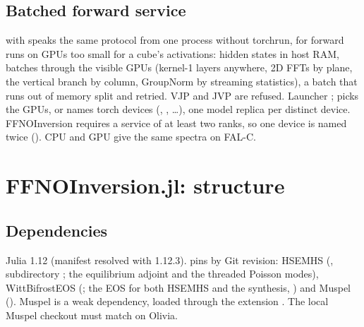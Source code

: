 \subsection{Batched forward service}
 with  speaks the same protocol from one process without torchrun, for forward runs on GPUs too small for a cube's activations: hidden states in host RAM, batches through the visible GPUs (kernel-1 layers anywhere, 2D FFTs by plane, the vertical branch by column, GroupNorm by streaming statistics), a batch that runs out of memory split and retried. VJP and JVP are refused. Launcher ;  picks the GPUs, or  names torch devices (, , \dots), one model replica per distinct device. FFNOInversion requires a service of at least two ranks, so one device is named twice (). CPU and GPU give the same spectra on FAL-C.

\section{FFNOInversion.jl: structure}

\subsection{Dependencies}
Julia 1.12 (manifest resolved with 1.12.3).  pins by Git revision:
HSEMHS  (, subdirectory ; the equilibrium adjoint and the threaded Poisson modes), WittBifrostEOS  (; the EOS for both HSEMHS and the synthesis, ) and Muspel  (). Muspel is a weak dependency, loaded through the extension . The local Muspel checkout must match on Olivia.

